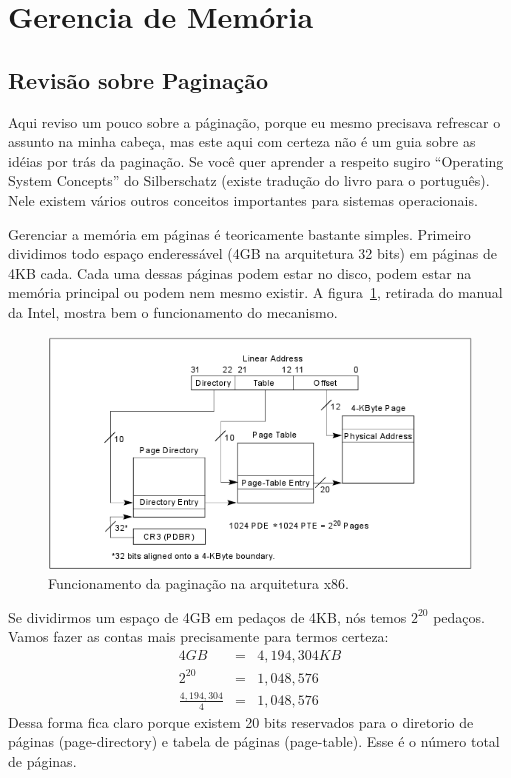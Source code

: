 \documentclass{article}
\begin{document}
\section{Gerencia de Memória}
\subsection{Revisão sobre Paginação}
Aqui reviso um pouco sobre a páginação, porque eu mesmo precisava refrescar o
assunto na minha cabeça, mas este aqui com certeza não é um guia sobre as idéias
por trás da paginação. Se você quer aprender a respeito sugiro ``Operating
System Concepts'' do Silberschatz (existe tradução do livro para o português).
Nele existem vários outros conceitos importantes para sistemas operacionais.

Gerenciar a memória em páginas é teoricamente bastante simples. Primeiro
dividimos todo espaço enderessável (4GB na arquitetura 32 bits) em páginas de
4KB cada. Cada uma dessas páginas podem estar no disco, podem estar na memória
principal ou podem nem mesmo existir. A figura~\ref{pagina}, retirada do manual
da Intel, mostra bem o funcionamento do mecanismo.

\begin{figure}
	\begin{center}
	\includegraphics[scale=0.8]{paginacao}
	\end{center}
	\caption{Funcionamento da paginação na arquitetura x86.}
	\label{pagina}
\end{figure}

Se dividirmos um espaço de 4GB em pedaços de 4KB, nós temos $2^{20}$ pedaços.
Vamos fazer as contas mais precisamente para termos certeza:
\begin{eqnarray*}
	4 GB & = & 4,194,304 KB \\
	2^{20} & = & 1,048,576 \\
	\frac{4,194,304}{4} & = & 1,048,576
\end{eqnarray*}
Dessa forma fica claro porque existem 20 bits reservados para o diretorio de
páginas (page-directory) e tabela de páginas (page-table). Esse é o número total
de páginas.
\end{document}

